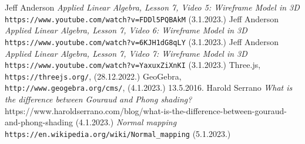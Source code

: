 \documentclass[a4paper,12pt]{article}
\begin{document}
\begin{thebibliography}{9}

 Jeff Anderson \emph{Applied Linear Algebra, Lesson 7, Video 5: Wireframe Model in 3D} \texttt{https://www.youtube.com/watch?v=FDDl5PQBAkM} (3.1.2023.)
 Jeff Anderson \emph{Applied Linear Algebra, Lesson 7, Video 6: Wireframe Model in 3D} \texttt{https://www.youtube.com/watch?v=6KJH1dG8qLY} (3.1.2023.)
 Jeff Anderson \emph{Applied Linear Algebra, Lesson 7, Video 7: Wireframe Model in 3D} \texttt{https://www.youtube.com/watch?v=YaxuxZiXnKI} (3.1.2023.)
 Three.js, \texttt{https://threejs.org/}, (28.12.2022.)
 GeoGebra, \texttt{http://www.geogebra.org/cms/}, (4.1.2023.)
  13.5.2016. Harold Serrano \emph{What is the difference between Gouraud and Phong shading?} https://www.haroldserrano.com/blog/what-is-the-difference-between-gouraud-and-phong-shading (4.1.2023.)
 \emph{Normal mapping} \texttt{https://en.wikipedia.org/wiki/Normal\_mapping} (5.1.2023.)
\end{thebibliography}
\end{document}
